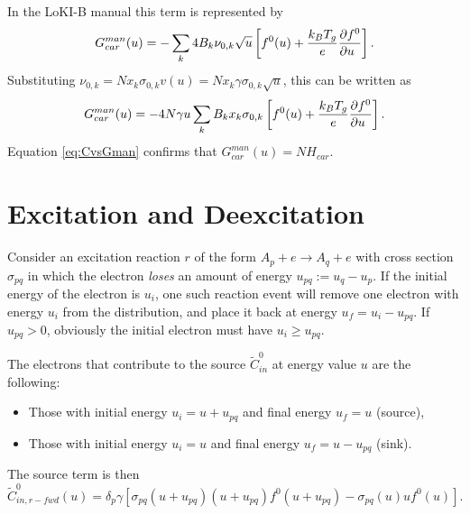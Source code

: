 \documentclass{book}
\begin{document}
In the LoKI-B manual this term is represented by \cite[eq. 12c]{Manual_2_2_0}
\begin{equation}
	G^{man}_{car}(u) = -\sum\limits_k 4B_k\nu_{0,k}\sqrt{u}\left[f^0(u) + \frac{k_BT_g}{e}\PDEV{f^0}{u}\right].
\end{equation}
Substituting $\nu_{0,k}=Nx_k\sigma_{0,k}v(u)=Nx_k\gamma\sigma_{0,k}\sqrt{u}$, this can
be written as
\begin{equation}
	G^{man}_{car}(u)
		= -4N\gamma u\sum\limits_k B_k x_k\sigma_{0,k} \left[f^0(u) + \frac{k_BT_g}{e}\PDEV{f^0}{u}\right].
\end{equation}
Equation \eqref{eq:CvsGman} confirms that $G^{man}_{car}(u) = NH_{car}$.


\section{Excitation and Deexcitation}

Consider an excitation reaction $r$ of the form $A_p + e \rightarrow A_q + e$ with
cross section $\sigma_{pq}$ in which the electron {\em loses} an amount of energy
$u_{pq}:=u_q-u_p$. If the initial energy of the electron is $u_i$, one such reaction
event will remove one electron with energy $u_i$ from the distribution, and
place it back at energy $u_f=u_i-u_{pq}$. If $u_{pq}>0$, obviously the initial electron
must have $u_i\geq u_{pq}$.

The electrons that contribute to the source $\tilde{C}^0_{in}$ at energy value $u$
are the following:
\begin{itemize}
	\item Those with initial energy $u_i=u+u_{pq}$ and final energy $u_f=u$ (source),
	\item Those with initial energy $u_i=u$ and final energy $u_f=u-u_{pq}$ (sink).
\end{itemize}
The source term is then
\begin{equation}
	\tilde{C}^0_{in,r-fwd}(u)
	=  \delta_p \gamma[
		\sigma_{pq}(u+u_{pq})(u+u_{pq})f^0(u+u_{pq})
		-
		\sigma_{pq}(u)uf^0(u)
	].
\end{equation}
\end{document}
